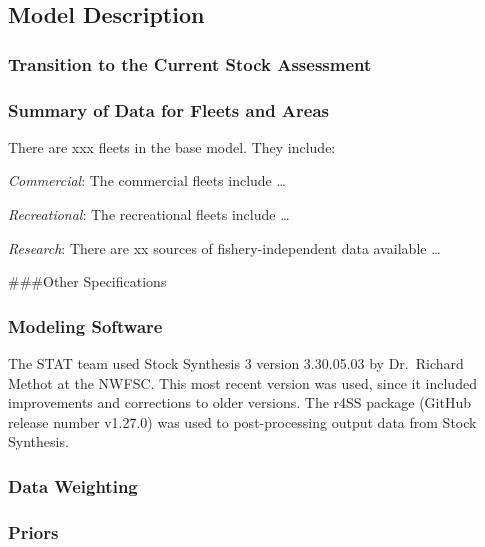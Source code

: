 \documentclass[12pt,]{article}
\begin{document}
\hypertarget{model-description}{%
\subsection{Model Description}\label{model-description}}

\hypertarget{transition-to-the-current-stock-assessment}{%
\subsubsection{Transition to the Current Stock
Assessment}\label{transition-to-the-current-stock-assessment}}

\hypertarget{summary-of-data-for-fleets-and-areas}{%
\subsubsection{Summary of Data for Fleets and
Areas}\label{summary-of-data-for-fleets-and-areas}}

There are xxx fleets in the base model. They include:

\emph{Commercial}: The commercial fleets include \ldots{}

\emph{Recreational}: The recreational fleets include \ldots{}

\emph{Research}: There are xx sources of fishery-independent data
available \ldots{}

\#\#\#Other Specifications

\hypertarget{modeling-software}{%
\subsubsection{Modeling Software}\label{modeling-software}}

The STAT team used Stock Synthesis 3 version 3.30.05.03 by Dr.~Richard
Methot at the NWFSC. This most recent version was used, since it
included improvements and corrections to older versions. The r4SS
package (GitHub release number v1.27.0) was used to post-processing
output data from Stock Synthesis.

\hypertarget{data-weighting}{%
\subsubsection{Data Weighting}\label{data-weighting}}

\hypertarget{priors}{%
\subsubsection{Priors}\label{priors}}
\end{document}
